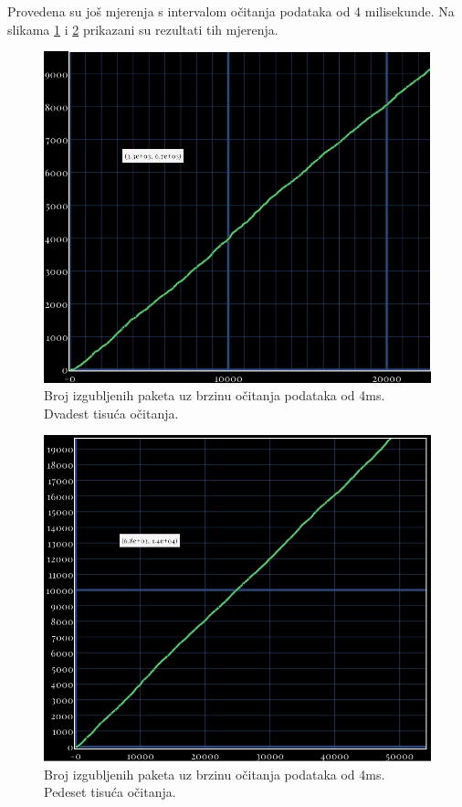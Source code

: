 \documentclass[times, utf8, diplomski]{diplomski}
\begin{document}
Provedena su još mjerenja s intervalom očitanja podataka od 4 milisekunde.
Na slikama \ref{fig:packet_loss_4_20} i \ref{fig:packet_loss_4_50} prikazani su rezultati tih mjerenja.

\begin{figure}[H]
  \includegraphics[width=\textwidth]{packets_lost_every_4ms_20k.png}
  \caption{Broj izgubljenih paketa uz brzinu očitanja podataka od 4ms. Dvadest tisuća očitanja.}
  \label{fig:packet_loss_4_20}
\end{figure}

\begin{figure}[H]
  \includegraphics[width=\textwidth]{packets_lost_every_4ms_50k.png}
  \caption{Broj izgubljenih paketa uz brzinu očitanja podataka od 4ms. Pedeset tisuća očitanja.}
  \label{fig:packet_loss_4_50}
\end{figure}
\end{document}
